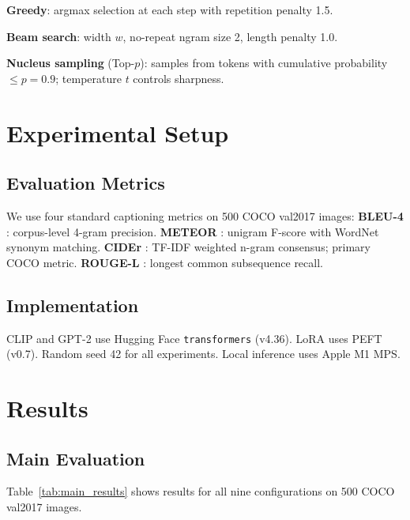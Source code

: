 \documentclass[conference]{IEEEtran}
\begin{document}
\textbf{Greedy}: argmax selection at each step with repetition penalty 1.5.

\textbf{Beam search}: width $w$, no-repeat ngram size 2, length penalty 1.0.

\textbf{Nucleus sampling} (Top-$p$): samples from tokens with cumulative probability $\leq p=0.9$; temperature $t$ controls sharpness.

\section{Experimental Setup}

\subsection{Evaluation Metrics}

We use four standard captioning metrics on 500 COCO val2017 images:
\textbf{BLEU-4} \cite{papineni2002bleu}: corpus-level 4-gram precision.
\textbf{METEOR} \cite{denkowski2014meteor}: unigram F-score with WordNet synonym matching.
\textbf{CIDEr} \cite{vedantam2015cider}: TF-IDF weighted n-gram consensus; primary COCO metric.
\textbf{ROUGE-L} \cite{lin2004rouge}: longest common subsequence recall.

\subsection{Implementation}

CLIP and GPT-2 use Hugging Face \texttt{transformers} (v4.36). LoRA uses PEFT (v0.7). Random seed 42 for all experiments. Local inference uses Apple M1 MPS.

\section{Results}

\subsection{Main Evaluation}

Table~\ref{tab:main_results} shows results for all nine configurations on 500 COCO val2017 images.
\end{document}
